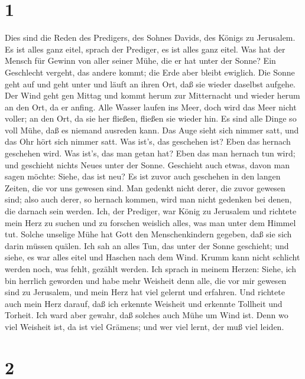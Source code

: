\hypertarget{section}{%
\section{1}\label{section}}

 Dies sind die Reden des Predigers, des Sohnes Davids, des
Königs zu Jerusalem.  Es ist alles ganz eitel, sprach der
Prediger, es ist alles ganz eitel.  Was hat der Mensch für
Gewinn von aller seiner Mühe, die er hat unter der Sonne? 
Ein Geschlecht vergeht, das andere kommt; die Erde aber bleibt ewiglich.
 Die Sonne geht auf und geht unter und läuft an ihren Ort,
daß sie wieder daselbst aufgehe.  Der Wind geht gen Mittag
und kommt herum zur Mitternacht und wieder herum an den Ort, da er
anfing.  Alle Wasser laufen ins Meer, doch wird das Meer
nicht voller; an den Ort, da sie her fließen, fließen sie wieder hin.
 Es sind alle Dinge so voll Mühe, daß es niemand ausreden
kann. Das Auge sieht sich nimmer satt, und das Ohr hört sich nimmer
satt.  Was ist's, das geschehen ist? Eben das hernach
geschehen wird. Was ist's, das man getan hat? Eben das man hernach tun
wird; und geschieht nichts Neues unter der Sonne. 
Geschieht auch etwas, davon man sagen möchte: Siehe, das ist neu? Es ist
zuvor auch geschehen in den langen Zeiten, die vor uns gewesen sind.
 Man gedenkt nicht derer, die zuvor gewesen sind; also auch
derer, so hernach kommen, wird man nicht gedenken bei denen, die darnach
sein werden.  Ich, der Prediger, war König zu Jerusalem
 und richtete mein Herz zu suchen und zu forschen weislich
alles, was man unter dem Himmel tut. Solche unselige Mühe hat Gott den
Menschenkindern gegeben, daß sie sich darin müssen quälen. 
Ich sah an alles Tun, das unter der Sonne geschieht; und siehe, es war
alles eitel und Haschen nach dem Wind.  Krumm kann nicht
schlicht werden noch, was fehlt, gezählt werden.  Ich
sprach in meinem Herzen: Siehe, ich bin herrlich geworden und habe mehr
Weisheit denn alle, die vor mir gewesen sind zu Jerusalem, und mein Herz
hat viel gelernt und erfahren.  Und richtete auch mein Herz
darauf, daß ich erkennte Weisheit und erkennte Tollheit und Torheit. Ich
ward aber gewahr, daß solches auch Mühe um Wind ist.  Denn
wo viel Weisheit ist, da ist viel Grämens; und wer viel lernt, der muß
viel leiden.

\hypertarget{section-1}{%
\section{2}\label{section-1}}

